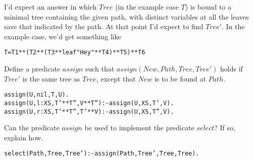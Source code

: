 \documentclass{popl}
\begin{document}
\begin{exercises}
\begin{ex}
\begin{ans}
I'd expect an answer in which $Tree$ (in the example case $T$) is bound to a minimal
tree containing the given path, with distinct variables at all the 
leaves save that indicated by the path.
At that point I'd expect to find $Tree'$. 
In the example case, we'd get something like
\begin{alltt}
        T = T1 ** (T2 ** (T3 ** leaf "Hey" ** T4) ** T5) ** T6
\end{alltt}
\end{ans}
\end{ex}

\begin{ex}
Define a predicate $assign$ such that $assign(New, Path, Tree, Tree')$ holds 
if $Tree'$ is the same tree as $Tree$, except that $New$ is 
to be found at $Path$.
\begin{ans}
\begin{alltt}
        assign(U, nil,   T,  U).
        assign(U, l:XS,  T'**T'', V**T'') :- assign(U, XS, T',  V).
        assign(U, r:XS,  T'**T'', T'**V)  :- assign(U, XS, T'', V).
\end{alltt}
\end{ans}
\end{ex}

\begin{ex}
Can the predicate $assign$ be used to implement the predicate $select$?
If so, explain how.
\begin{ans}
\begin{alltt}
        select(Path, Tree, Tree') :- assign(Path, Tree', Tree, Tree).
\end{alltt}
\end{ans}
\end{ex}
\end{exercises}
\end{document}

